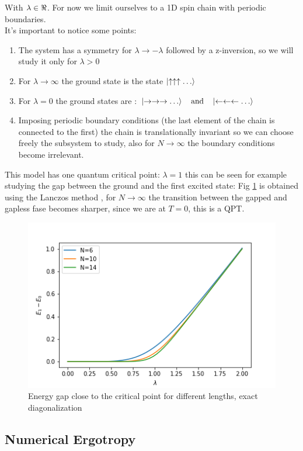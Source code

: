 \documentclass[10pt,a4paper]{article}
\begin{document}
	With $\lambda \in \real$. For now we limit ourselves to a 1D spin chain with periodic boundaries.\\ 
	It's important to notice some points:
	\begin{enumerate}
		\item The system has a symmetry for $\lambda \rightarrow -\lambda$ followed by a z-inversion, so we will study it only for $\lambda>0$
		\item For $\lambda \rightarrow \infty$ the ground state is the state $\ket{\uparrow\uparrow\uparrow \dots} $
		\item For $\lambda=0$ the ground states are : $\ket{\rightarrow\rightarrow\rightarrow \dots} \quad \text{and} \quad \ket{\leftarrow\leftarrow\leftarrow\dots} $ 
		\item Imposing periodic boundary conditions (the last element of the chain is connected to the first) the chain is translationally invariant so we can choose freely the subsystem to study, also for $N\rightarrow\infty$ the boundary conditions become irrelevant.
	\end{enumerate}
	This model has one quantum critical point: $\lambda=1$ \cite{sachdev_2011} this can be seen for example studying the gap between the ground and the first excited state:
	Fig \ref{fig:energap} is obtained using the Lanczos method \cite{Jaegon_2007}, for $N\rightarrow\infty$ the transition between the gapped and gapless fase becomes sharper, since we are at $T=0$, this is  a QPT.
	

	\begin{figure}[h]
		\centering
		\includegraphics[width=0.7\linewidth]{scalinggap}
		\caption{Energy gap close to the critical point for different lengths, exact diagonalization}
		\label{fig:energap}
	\end{figure}
	
	\subsection{Numerical Ergotropy}\label{sec:numergo}
	
\end{document}
